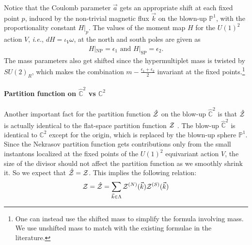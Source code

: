 \documentclass[letterpaper, 11pt]{article}
\def\IC{\mathbb{C}}
\def\IP{\mathbb{P}}
\def\CZ{{\cal Z}}
\def\e{\epsilon}
\begin{document}
Notice that the Coulomb parameter $\vec{a}$ gets an appropriate shift at each fixed point $p$, induced by the non-trivial magnetic flux $\vec{k}$ on the blown-up $\IP^1$, with the proportionality constant $H|_p$. The values of the moment map $H$ for the $U(1)^2$ action $V$,  \textit{i.e.}, $dH = \iota_V \omega$, at the north and south poles are given as
\begin{align}
  H|_\text{NP} = \epsilon_1 \text{ and } H|_\text{SP} = \epsilon_2.
\end{align}
The mass parameters also get shifted since the hypermultiplet mass is twisted by $SU(2)_R$, which makes the combination $m - \frac{\e_1+\e_2}{2}$ invariant at the fixed points.\footnote{One can instead use the shifted mass to simplify the formula involving mass. We use unshifted mass to match with the existing formulae in the literature.} 

\paragraph{Partition function on $\hat{\IC}^2$ vs $\IC^2$}
Another important fact for the partition function $\hat{\CZ}$ on the blow-up $\hat{\IC}^2$ is that $\hat{\CZ}$ is actually identical to the flat-space partition function $\CZ$  \cite{Nakajima:2003pg,Nakajima:2003uh,Nakajima:2005fg, Gottsche:2006bm, Nakajima:2009qjc, Gottsche:2010ig}.
The blow-up $\hat{\IC}^2$ is identical to $\IC^2$ except for the origin, which is replaced by the blown-up sphere $\IP^1$. 
Since the Nekrasov partition function gets contributions only from the small instantons localized at the fixed points of the $U(1)^2$ equivariant action $V$, the size of the divisor should not affect the partition function as we smoothly shrink it. So we expect that $\hat{\CZ} = \CZ$. This implies the following relation: 
\begin{align} 
  \label{eq:blowup-generic}
  \CZ = \hat{\CZ} = \sum_{\vec{k} \in \Lambda} \CZ^{(N)}(\vec{k}) \CZ^{(S)}(\vec{k})
\end{align}
\end{document}
